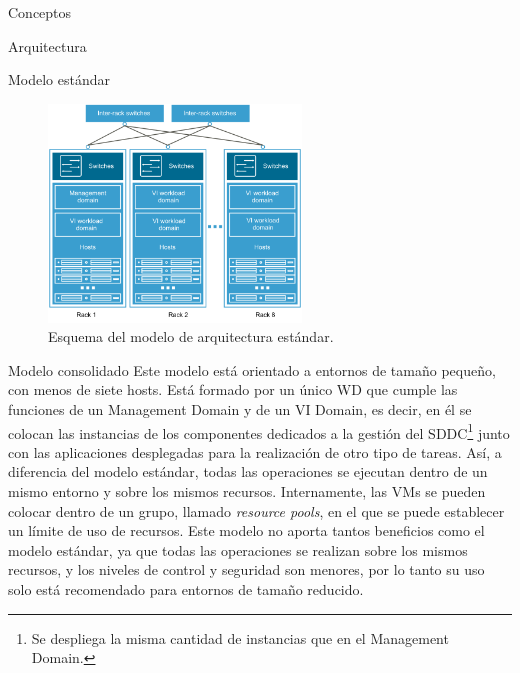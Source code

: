 \begin{section}{Conceptos}
\begin{subsection}{Arquitectura}
\begin{subsubsection}{Modelo estándar}
\begin{figure}[h!]
  \centering
  \includegraphics[width=0.6\textwidth]{imaxes/conceptosPrevios/arquitect_standarCF.png}
  \caption{Esquema del modelo de arquitectura estándar.}
  \label{fig:modelostandard}
\end{figure}

\FloatBarrier
\end{subsubsection}
\begin{subsubsection}{Modelo consolidado}
Este modelo está orientado a entornos de tamaño pequeño, con menos de siete hosts. Está formado por un único WD que cumple las funciones de un Management Domain y de un VI Domain, es decir, en él se colocan las instancias de los componentes dedicados a la gestión del SDDC\footnote{Se despliega la misma cantidad de instancias que en el Management Domain.} junto con las aplicaciones desplegadas para la realización de otro tipo de tareas. Así, a diferencia del modelo estándar, todas las operaciones se ejecutan dentro de un mismo entorno y sobre los mismos recursos. Internamente, las VMs se pueden colocar dentro de un grupo, llamado \textit{resource pools}, en el que se puede establecer un límite de uso de recursos.
Este modelo no aporta tantos beneficios como el modelo estándar, ya que todas las operaciones se realizan sobre los mismos recursos, y los niveles de control y seguridad son menores, por lo tanto su uso solo está recomendado para entornos de tamaño reducido.


\end{subsubsection}
\end{subsection}
\end{section}
